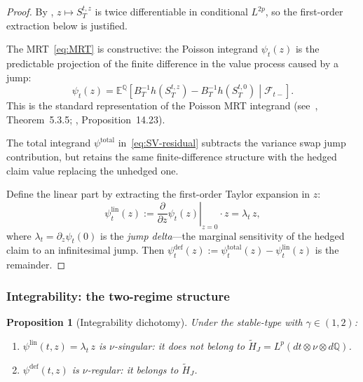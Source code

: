 \documentclass[11pt,a4paper]{article}
\theoremstyle{plain}
\newtheorem{proposition}[theorem]{Proposition}
\theoremstyle{definition}
\theoremstyle{remark}
\newcommand{\E}{\mathbb{E}}
\newcommand{\QQ}{\mathbb{Q}}
\newcommand{\F}{\mathcal{F}}
\begin{document}
\begin{proof}
By , $z \mapsto S_T^{t,z}$ is
twice differentiable in conditional $L^{2p}$, so the
first-order extraction below is justified.

The MRT~\eqref{eq:MRT} is constructive: the Poisson integrand
$\psi_t(z)$ is the predictable projection of the finite
difference in the value process caused by a jump:
\begin{equation}\label{eq:psi-FD}
  \psi_t(z) = \E^\QQ\!\left[\left.
  B_T^{-1}h(S_T^{t,z}) - B_T^{-1}h(S_T^{t,0})
  \;\right|\;\F_{t-}\right].
\end{equation}
This is the standard representation of the Poisson MRT integrand
(see~\cite{Applebaum2009}, Theorem~5.3.5;
\cite{ContTankov2004}, Proposition~14.23).

The total integrand $\psi^{\mathrm{total}}$ in~\eqref{eq:SV-residual}
subtracts the variance swap jump contribution, but retains the
same finite-difference structure with the hedged claim value
replacing the unhedged one.

Define the linear part by extracting the first-order Taylor
expansion in $z$:
\[
  \psi_t^{\mathrm{lin}}(z) := \left.\frac{\partial}{\partial z}
  \psi_t(z)\right|_{z=0} \cdot z
  = \lambda_t\,z,
\]
where $\lambda_t = \partial_z \psi_t(0)$ is the
\emph{jump delta}---the marginal sensitivity of the
hedged claim to an infinitesimal jump.  Then
$\psi_t^{\mathrm{def}}(z)
:= \psi_t^{\mathrm{total}}(z) - \psi_t^{\mathrm{lin}}(z)$
is the remainder.
\end{proof}


\subsubsection{Integrability: the two-regime structure}

\begin{proposition}[Integrability dichotomy]\label{prop:integrability}
Under the stable-type  with $\gamma \in (1,2)$:
\begin{enumerate}[label=(\alph*)]
\item $\psi^{\mathrm{lin}}(t,z) = \lambda_t\,z$ is
  \emph{$\nu$-singular}: it does not belong to
  $\widetilde{H}_J = L^p(dt \otimes \nu \otimes d\QQ)$.

\item $\psi^{\mathrm{def}}(t,z)$ is
  \emph{$\nu$-regular}: it belongs to $\widetilde{H}_J$.
\end{enumerate}
\end{proposition}
\end{document}
